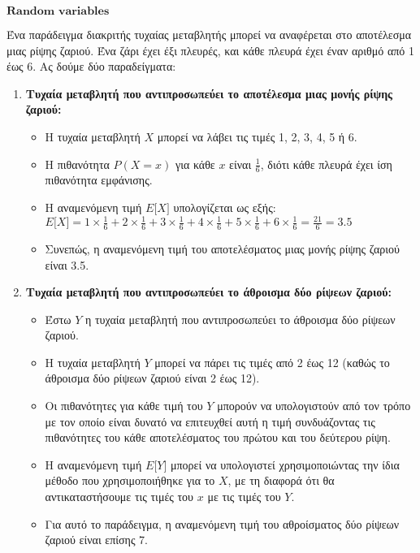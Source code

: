 \documentclass[11pt]{article}
\providecommand{\tightlist}{%
      \setlength{\itemsep}{0pt}\setlength{\parskip}{0pt}}
\begin{document}
    \(\textbf{Random variables}\)

    Ένα παράδειγμα διακριτής τυχαίας μεταβλητής μπορεί να αναφέρεται στο
αποτέλεσμα μιας ρίψης ζαριού. Ένα ζάρι έχει έξι πλευρές, και κάθε πλευρά
έχει έναν αριθμό από 1 έως 6. Ας δούμε δύο παραδείγματα:

\begin{enumerate}
\def\labelenumi{\arabic{enumi}.}
\tightlist
\item
  \textbf{Τυχαία μεταβλητή που αντιπροσωπεύει το αποτέλεσμα μιας μονής
  ρίψης ζαριού:}

  \begin{itemize}
  \tightlist
  \item
    Η τυχαία μεταβλητή $ X $ μπορεί να λάβει τις τιμές 1, 2, 3, 4, 5 ή
    6.
  \item
    Η πιθανότητα $ P(X = x) $ για κάθε $ x $ είναι $ \frac{1}{6}
    $, διότι κάθε πλευρά έχει ίση πιθανότητα εμφάνισης.
  \item
    Η αναμενόμενη τιμή $ E{[}X{]} $ υπολογίζεται ως εξής: $ E{[}X{]}
    = 1 \times \frac{1}{6} + 2 \times \frac{1}{6} + 3 \times \frac{1}{6}
    + 4 \times \frac{1}{6} + 5 \times \frac{1}{6} + 6 \times \frac{1}{6}
    = \frac{21}{6} = 3.5 $
  \item
    Συνεπώς, η αναμενόμενη τιμή του αποτελέσματος μιας μονής ρίψης
    ζαριού είναι 3.5.
  \end{itemize}
\item
  \textbf{Τυχαία μεταβλητή που αντιπροσωπεύει το άθροισμα δύο ρίψεων
  ζαριού:}

  \begin{itemize}
  \tightlist
  \item
    Έστω $ Y $ η τυχαία μεταβλητή που αντιπροσωπεύει το άθροισμα δύο
    ρίψεων ζαριού.
  \item
    Η τυχαία μεταβλητή $ Y $ μπορεί να πάρει τις τιμές από 2 έως 12
    (καθώς το άθροισμα δύο ρίψεων ζαριού είναι 2 έως 12).
  \item
    Οι πιθανότητες για κάθε τιμή του $ Y $ μπορούν να υπολογιστούν από
    τον τρόπο με τον οποίο είναι δυνατό να επιτευχθεί αυτή η τιμή
    συνδυάζοντας τις πιθανότητες του κάθε αποτελέσματος του πρώτου και
    του δεύτερου ρίψη.
  \item
    Η αναμενόμενη τιμή $ E{[}Y{]} $ μπορεί να υπολογιστεί
    χρησιμοποιώντας την ίδια μέθοδο που χρησιμοποιήθηκε για το $ X $,
    με τη διαφορά ότι θα αντικαταστήσουμε τις τιμές του $ x $ με τις
    τιμές του $ Y $.
  \item
    Για αυτό το παράδειγμα, η αναμενόμενη τιμή του αθροίσματος δύο
    ρίψεων ζαριού είναι επίσης 7.
  \end{itemize}
\end{enumerate}
\end{document}
